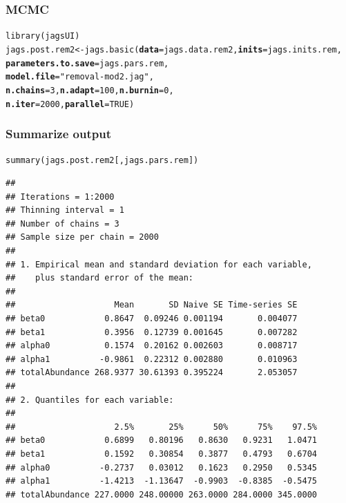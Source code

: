 \documentclass[color=usenames,dvipsnames]{beamer}\usepackage[]{graphicx}\usepackage[]{color}
\makeatletter
\newcommand{\hlnum}[1]{\textcolor[rgb]{0.69,0.494,0}{#1}}%
\newcommand{\hlstr}[1]{\textcolor[rgb]{0.749,0.012,0.012}{#1}}%
\newcommand{\hlstd}[1]{\textcolor[rgb]{0,0,0}{#1}}%
\newcommand{\hlkwb}[1]{\textcolor[rgb]{0,0.341,0.682}{#1}}%
\newcommand{\hlkwc}[1]{\textcolor[rgb]{0,0,0}{\textbf{#1}}}%
\newcommand{\hlkwd}[1]{\textcolor[rgb]{0.004,0.004,0.506}{#1}}%
\newenvironment{kframe}{%
 \def\at@end@of@kframe{}%
 \ifinner\ifhmode%
  \def\at@end@of@kframe{\end{minipage}}%
  \begin{minipage}{\columnwidth}%
 \fi\fi%
 \def\FrameCommand##1{\hskip\@totalleftmargin \hskip-\fboxsep
 \colorbox{shadecolor}{##1}\hskip-\fboxsep
     \hskip-\linewidth \hskip-\@totalleftmargin \hskip\columnwidth}%
 \MakeFramed {\advance\hsize-\width
   \@totalleftmargin\z@ \linewidth\hsize
   \@setminipage}}%
 {\par\unskip\endMakeFramed%
 \at@end@of@kframe}
\newenvironment{knitrout}{}{} %
\makeatother
\begin{document}
\begin{frame}[fragile]
  \frametitle{MCMC}
  \small
\begin{knitrout}\scriptsize
{}\color{fgcolor}\begin{kframe}
\begin{alltt}
\hlkwd{library}\hlstd{(jagsUI)}
\hlstd{jags.post.rem2} \hlkwb{<-} \hlkwd{jags.basic}\hlstd{(}\hlkwc{data}\hlstd{=jags.data.rem2,} \hlkwc{inits}\hlstd{=jags.inits.rem,}
                             \hlkwc{parameters.to.save}\hlstd{=jags.pars.rem,}
                             \hlkwc{model.file}\hlstd{=}\hlstr{"removal-mod2.jag"}\hlstd{,}
                             \hlkwc{n.chains}\hlstd{=}\hlnum{3}\hlstd{,} \hlkwc{n.adapt}\hlstd{=}\hlnum{100}\hlstd{,} \hlkwc{n.burnin}\hlstd{=}\hlnum{0}\hlstd{,}
                             \hlkwc{n.iter}\hlstd{=}\hlnum{2000}\hlstd{,} \hlkwc{parallel}\hlstd{=}\hlnum{TRUE}\hlstd{)}
\end{alltt}
\end{kframe}
\end{knitrout}
\end{frame}



\begin{frame}[fragile]
  \frametitle{Summarize output}
\begin{knitrout}\tiny
{}\color{fgcolor}\begin{kframe}
\begin{alltt}
\hlkwd{summary}\hlstd{(jags.post.rem2[,jags.pars.rem])}
\end{alltt}
\begin{verbatim}
## 
## Iterations = 1:2000
## Thinning interval = 1 
## Number of chains = 3 
## Sample size per chain = 2000 
## 
## 1. Empirical mean and standard deviation for each variable,
##    plus standard error of the mean:
## 
##                    Mean       SD Naive SE Time-series SE
## beta0            0.8647  0.09246 0.001194       0.004077
## beta1            0.3956  0.12739 0.001645       0.007282
## alpha0           0.1574  0.20162 0.002603       0.008717
## alpha1          -0.9861  0.22312 0.002880       0.010963
## totalAbundance 268.9377 30.61393 0.395224       2.053057
## 
## 2. Quantiles for each variable:
## 
##                    2.5%       25%      50%      75%    97.5%
## beta0            0.6899   0.80196   0.8630   0.9231   1.0471
## beta1            0.1592   0.30854   0.3877   0.4793   0.6704
## alpha0          -0.2737   0.03012   0.1623   0.2950   0.5345
## alpha1          -1.4213  -1.13647  -0.9903  -0.8385  -0.5475
## totalAbundance 227.0000 248.00000 263.0000 284.0000 345.0000
\end{verbatim}
\end{kframe}
\end{knitrout}
\end{frame}
\end{document}
